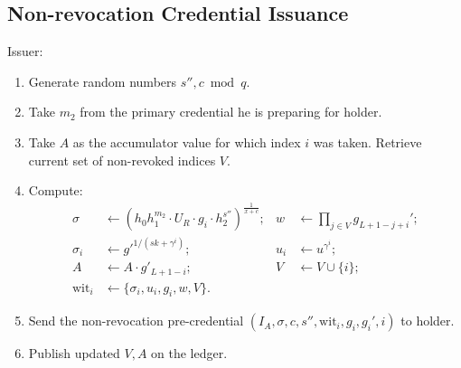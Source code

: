 \subsection{Non-revocation Credential Issuance}

Issuer:
\begin{enumerate}
    \item Generate random numbers $s'',c\bmod{q}$.
    \item Take $m_2$ from the primary 
    credential he is preparing for holder.
    \item Take $A$ as the accumulator value for which index $i$ was taken. Retrieve current set of non-revoked indices $V$.
    \item Compute:
\begin{align}
\sigma &\leftarrow \left( h_0 h_1^{m_2}\cdot U_R\cdot  g_i\cdot  h_2^{s''}\right)^{\frac{1}{x+c}};&
w &\leftarrow \prod_{j\in V}g_{L+1-j+i}';\\
\sigma_i &\leftarrow g'^{1/(sk+\gamma^i)};&
u_i &\leftarrow u^{\gamma^i};\\
A&\leftarrow A\cdot g'_{L+1-i};&
V&\leftarrow V\cup\{i\};\\
\mathrm{wit}_i&\leftarrow\{\sigma_i,u_i,g_i,w,V\}.
\end{align}
\item Send the non-revocation pre-credential  $(I_A,\sigma,c,s'',\mathrm{wit}_i,g_i,g_i',i)$ to holder.
\item  Publish updated $V, A$ on the ledger.
\end{enumerate}


